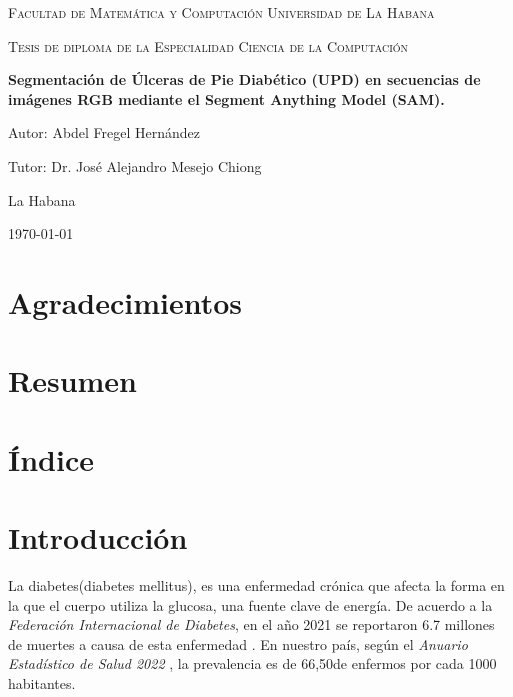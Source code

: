 \documentclass[12pt]{article}
\begin{document}
	\begin{titlepage}
		  \centering
		 
		  
		  {\scshape\LARGE Facultad de Matemática y 
		  	Computación
		  	Universidad de La Habana\par}
		  \vspace{1cm}
		  
		   \vspace{1cm}
		  
		  {\scshape\Large Tesis de diploma de la 
		  	Especialidad Ciencia de la 
		  	Computaci\'on \par}
		  \vspace{1.5cm}
		  
		  {\huge\bfseries Segmentaci\'on de \'Ulceras de Pie Diab\'etico (UPD) en secuencias de im\'agenes RGB mediante el Segment Anything Model (SAM). \par}
		  \vspace{2cm}
		  
		  {\Large Autor: Abdel Fregel Hern\'andez \par}
		  
		  \Large Tutor: Dr. Jos\'e Alejandro Mesejo Chiong
		  \vfill
		  
		  {\large La Habana}
		  
		  {\large \today \par} %
	\end{titlepage}
	
	\section{Agradecimientos}
	\newpage
	
	
	\section{Resumen}
	\newpage
	
	\section{\'Indice}
	\tableofcontents
	\newpage
	\cleardoublepage
	
	
	\section{Introducci\'on}
	La diabetes(diabetes mellitus), es una enfermedad cr\'onica que afecta la forma en la que el cuerpo utiliza la glucosa, una fuente clave de energ\'ia. De acuerdo a la \textit{Federaci\'on Internacional de Diabetes}, en el a\~no 2021 se reportaron 6.7 millones de muertes a causa de esta enfermedad \parencite{DiabetesAtlas2024}. En nuestro pa\'is, seg\'un el \textit{Anuario Estadístico de Salud 2022} \parencite{msp2022}, la prevalencia es de 66,50\textdiscount \space de enfermos por cada 1000 habitantes.
	\\
	
\end{document}
